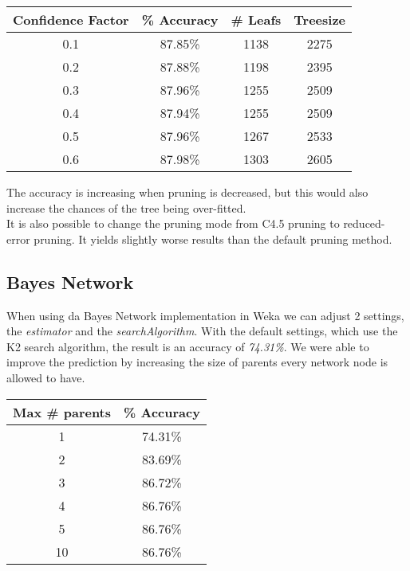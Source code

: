 \documentclass{article}
\begin{document}
 
 \begin{center}
 \begin{tabular}{ c | c | c | c}
 \textbf{Confidence Factor} & \textbf{\% Accuracy} & \textbf{\# Leafs} & \textbf{Treesize}\\
 \hline
 0.1 & 87.85\% & 1138 & 2275\\
 0.2 & 87.88\% & 1198 & 2395\\
 0.3 & 87.96\% & 1255 & 2509\\
 0.4 & 87.94\% & 1255 & 2509\\
 0.5 & 87.96\% & 1267 & 2533\\
 0.6 & 87.98\% & 1303 & 2605\\
 \end{tabular}
 \end{center}
 
 The accuracy is increasing when pruning is decreased, but this would also increase the chances of the tree being over-fitted.\\
 It is also possible to change the pruning mode from C4.5 pruning to reduced-error pruning. It yields slightly worse results than the default pruning method.
 
 

\subsection{Bayes Network}
When using da Bayes Network implementation in Weka we can adjust 2 settings, the \emph{estimator} and the \emph{searchAlgorithm}. With the default settings, which use the K2 search algorithm, the result is an accuracy of \emph{74.31\%}. We were able to improve the prediction by increasing the size of parents every network node is allowed to have.

\begin{center}
\begin{tabular}{ c | c }
\textbf{Max \# parents} & \textbf{\% Accuracy} \\
\hline
1  & 74.31\% \\
2  & 83.69\% \\
3  & 86.72\% \\
4  & 86.76\% \\
5  & 86.76\% \\
10 & 86.76\% \\
\end{tabular}
\end{center}
\end{document}
